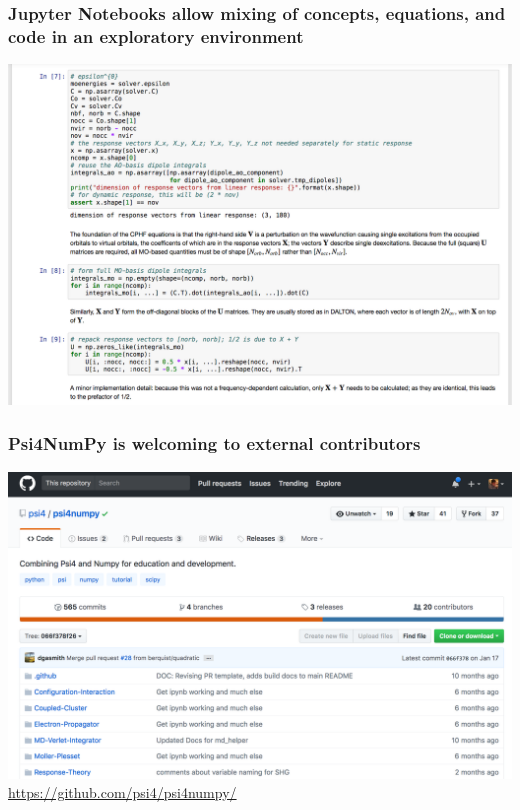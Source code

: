 \documentclass[%
    xcolor=usenames,dvipsnames,svgnames%
]{beamer}
\newenvironment{nscenter}
 {\parskip=0pt\par\nopagebreak\centering}
 {\par\noindent\ignorespacesafterend}
\newcommand\pfn{Psi4NumPy}
\begin{document}
\begin{frame}
  \frametitle{Jupyter Notebooks allow mixing of concepts, equations, and code in an exploratory environment}
  \begin{nscenter}
    \includegraphics[width=\linewidth,keepaspectratio]{./figures/psi4numpy_notebook_2.png}
  \end{nscenter}
\end{frame}

\begin{frame}
  \frametitle{\pfn{} is welcoming to external contributors}
  \begin{nscenter} %
    \includegraphics[width=\linewidth,keepaspectratio]{./figures/psi4numpy_github.png}
    {\scriptsize \url{https://github.com/psi4/psi4numpy/}}
  \end{nscenter}
\end{frame}
\end{document}

